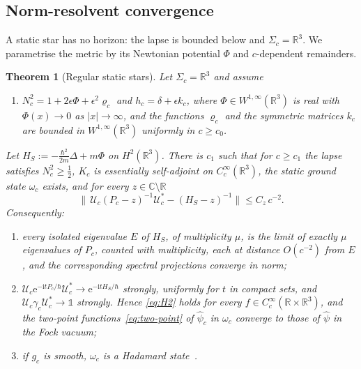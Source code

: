 \documentclass[%
 aip,
 jmp,
 amsmath,amssymb,
 reprint, onecolumn
]{revtex4-1}
\newtheorem{theorem}{Theorem}
\theoremstyle{definition}
\theoremstyle{remark}
\newcommand{\R}{\mathbb{R}}
\newcommand{\C}{\mathbb{C}}
\newcommand{\one}{\mathds{1}}
\newcommand{\rmi}{\mathrm{i}}
\newcommand{\rme}{\mathrm{e}}
\begin{document}
\subsection{Norm-resolvent convergence}

A static star has no horizon: the lapse is bounded below and
$\Sigma_c=\R^3$. We parametrise the metric by its Newtonian potential
$\Phi$ and $c$-dependent remainders.

\begin{theorem}[Regular static stars]\label{thm:stars}
Let $\Sigma_c=\R^3$ and assume
\begin{enumerate}[label=(S\arabic*)]
\item $N_c^2=1+2\epsilon\Phi+\epsilon^2\varrho_c$ and $h_c=\delta+\epsilon
k_c$, where $\Phi\in W^{1,\infty}(\R^3)$ is real with $\Phi(x)\to0$ as
$|x|\to\infty$, and the functions $\varrho_c$ and the symmetric
matrices $k_c$ are bounded in $W^{1,\infty}(\R^3)$ uniformly in
$c\geq c_0$.
\end{enumerate}
Let $H_S:=-\frac{\hbar^2}{2m}\Delta+m\Phi$ on $H^2(\R^3)$. There is
$c_1$ such that for $c\geq c_1$ the lapse satisfies $N_c^2\geq\frac12$,
$K_c$ is essentially self-adjoint on $C_c^\infty(\R^3)$, the static
ground state $\omega_c$ exists, and for every $z\in\C\setminus\R$
\begin{equation}\label{eq:norm-resolvent}
\bigl\|\,\mathcal{U}_c(P_c-z)^{-1}\mathcal{U}_c^*-(H_S-z)^{-1}\bigr\|
\leq C_z\,c^{-2}.
\end{equation}
Consequently:
\begin{enumerate}[label=(\alph*)]
\item every isolated eigenvalue $E$ of $H_S$, of multiplicity $\mu$, is
the limit of exactly $\mu$ eigenvalues of $P_c$, counted with
multiplicity, each at distance $O(c^{-2})$ from $E$, and the
corresponding spectral projections converge in norm;
\item $\mathcal{U}_c\rme^{-\rmi tP_c/\hbar}\mathcal{U}_c^*\to
\rme^{-\rmi tH_S/\hbar}$ strongly, uniformly for $t$ in compact sets, and
$\mathcal{U}_c\gamma_c\mathcal{U}_c^*\to\one$ strongly. Hence
\eqref{eq:H2} holds for every $f\in C_c^\infty(\R\times\R^3)$, and the
two-point functions~\eqref{eq:two-point} of $\hat\psi_c$ in $\omega_c$
converge to those of $\hat\psi$ in the Fock vacuum;
\item if $g_c$ is smooth, $\omega_c$ is a Hadamard
state~\cite{SahlmannVerch2000}.
\end{enumerate}
\end{theorem}
\end{document}
